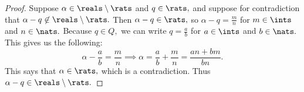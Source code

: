 \begin{proof}
    Suppose $\alpha\in\reals\setminus\rats$ and $q\in\rats,$ and suppose for contradiction that $\alpha - q \not\in\reals\setminus\rats.$ Then $\alpha - q\in\rats,$ so $\alpha - q = \frac{m}{n}$ for $m\in\ints$ and $n\in\nats.$ Because $q\in Q,$ we can write $q=\frac{a}{b}$ for $a\in\ints$ and $b\in\nats.$ This gives us the following: $$\alpha - \frac{a}{b} = \frac{m}{n} \implies \alpha = \frac{a}{b} + \frac{m}{n} = \frac{an+bm}{bn}.$$ This says that $\alpha\in\rats,$ which is a contradiction. Thus $\alpha - q \in\reals\setminus\rats.$
\end{proof}